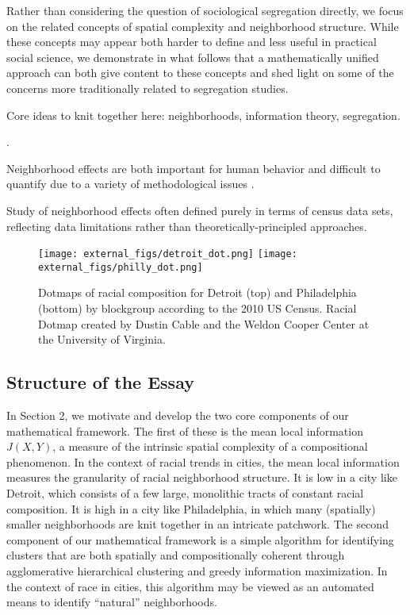 	Rather than considering the question of sociological segregation directly, we focus on the related concepts of spatial complexity and neighborhood structure. While these concepts may appear both harder to define and less useful in practical social science, we demonstrate in what follows that a mathematically unified approach can both give content to these concepts and shed light on some of the concerns more traditionally related to segregation studies. 

	Core ideas to knit together here: neighborhoods, information theory, segregation. 



	\nocite{Wong2004,Wong1999,Press2009a,Holloway2012,Lee2008,Louf2015,Webber1979,Bivand2014b,Bivand2014a,Bivand2014}.

	Neighborhood effects are both important for human behavior and difficult to quantify due to a variety of methodological issues \cite{Sampson2002}. 

	Study of neighborhood effects often defined purely in terms of census data sets, reflecting data limitations rather than theoretically-principled approaches. \cite{Dietz2002}


	
	\begin{figure}
	\centering
		\texttt{[image: external\_figs/detroit\_dot.png]}
		\texttt{[image: external\_figs/philly\_dot.png]}
		\caption{Dotmaps of racial composition for Detroit (top) and Philadelphia (bottom) by blockgroup according to the 2010 US Census. Racial Dotmap created by Dustin Cable and the Weldon Cooper Center at the University of Virginia.} 
		\label{fig:info_cross}
	\end{figure}	

\subsection{Structure of the Essay}
	In Section 2, we motivate and develop the two core components of our mathematical framework. The first of these is the mean local information $J(X,Y)$, a measure of the intrinsic spatial complexity of a compositional phenomenon. In the context of racial trends in cities, the mean local information measures the granularity of racial neighborhood structure. It is low in a city like Detroit, which consists of a few large, monolithic tracts of constant racial composition. It is high in a city like Philadelphia, in which many (spatially) smaller neighborhoods are knit together in an intricate patchwork. The second component of our mathematical framework is a simple algorithm for identifying clusters that are both spatially and compositionally coherent through agglomerative hierarchical clustering and greedy information maximization. In the context of race in cities, this algorithm may be viewed as an automated means to identify ``natural'' neighborhoods. 

